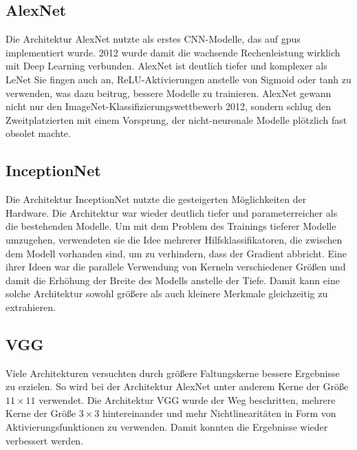   


\subsection{AlexNet} 

Die Architektur AlexNet nutzte als erstes CNN-Modelle, das auf \ac{gpu}s implementiert wurde.  2012 wurde damit die wachsende Rechenleistung wirklich mit Deep Learning verbunden. AlexNet ist deutlich tiefer und komplexer als LeNet Sie fingen auch an, ReLU-Aktivierungen anstelle von Sigmoid oder tanh zu verwenden, was dazu beitrug, bessere Modelle zu trainieren. AlexNet gewann nicht nur den ImageNet-Klassifizierungswettbewerb 2012, sondern schlug den Zweitplatzierten mit einem Vorsprung, der nicht-neuronale Modelle plötzlich fast obsolet machte. \cite{Krizhevsky:2012}



\subsection{InceptionNet}


Die Architektur InceptionNet nutzte die gesteigerten Möglichkeiten der Hardware. Die Architektur war wieder deutlich tiefer und parameterreicher als die bestehenden Modelle. Um mit dem Problem des Trainings tieferer Modelle umzugehen, verwendeten sie die Idee mehrerer Hilfsklassifikatoren, die zwischen dem Modell vorhanden sind, um zu verhindern, dass der Gradient abbricht. Eine ihrer Ideen war die parallele Verwendung von Kerneln verschiedener Größen und damit die Erhöhung der Breite des Modells anstelle der Tiefe. Damit kann eine solche Architektur sowohl größere als auch kleinere Merkmale gleichzeitig zu extrahieren. \cite{Szegedy:2014}


\subsection{VGG}

Viele Architekturen versuchten durch größere Faltungskerne bessere Ergebnisse zu erzielen. So wird bei der Architektur AlexNet unter anderem Kerne der Größe $11 \times 11$ verwendet. Die Architektur VGG wurde der Weg beschritten, mehrere Kerne der Größe $3\times 3$ hintereinander  und mehr Nichtlinearitäten in Form von Aktivierungsfunktionen zu verwenden. Damit konnten die Ergebnisse wieder verbessert werden. \cite{Zhang:2015,Simonyan:2015}

